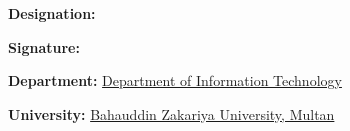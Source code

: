 \vspace{0.5cm}

\noindent
\textbf{Designation:} \underline{\hspace{6cm}}  

\vspace{0.5cm}

\noindent
\textbf{Signature:} \underline{\hspace{6cm}}  

\vspace{0.5cm}

\noindent
\textbf{Department:} \underline{Department of Information Technology}

\vspace{0.5cm}

\noindent
\textbf{University:} \underline{Bahauddin Zakariya University, Multan}

\newpage

